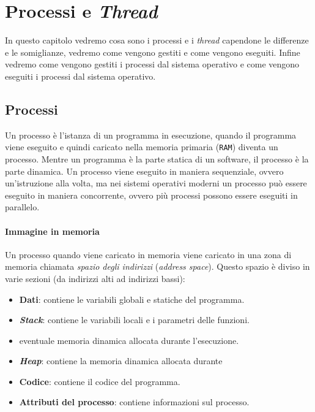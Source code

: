 \chapter{Processi e \textit{Thread}}

In questo capitolo vedremo cosa sono i processi e i \textit{thread} capendone le differenze e le somiglianze, vedremo come vengono gestiti e come vengono eseguiti. Infine vedremo come vengono gestiti i processi dal sistema operativo e come vengono eseguiti i processi dal sistema operativo.

\section{Processi}
    Un processo è l'istanza di un programma in esecuzione, quando il programma viene eseguito e quindi caricato nella memoria primaria (\texttt{RAM}) diventa un processo. Mentre un programma è la parte statica di un software, il processo è la parte dinamica. Un processo viene eseguito in maniera sequenziale, ovvero un'istruzione alla volta, ma nei sistemi operativi moderni un processo può essere eseguito in maniera concorrente, ovvero più processi possono essere eseguiti in parallelo.
    \subsubsection{Immagine in memoria}
        Un processo quando viene caricato in memoria viene caricato in una zona di memoria chiamata \textit{spazio degli indirizzi} (\textit{address space}). Questo spazio è diviso in varie sezioni (da indirizzi alti ad indirizzi bassi):
        \begin{itemize}
            \item \textbf{Dati}: contiene le variabili globali e statiche del programma.
            \item \textbf{\textit{Stack}}: contiene le variabili locali e i parametri delle funzioni.
            \item eventuale memoria dinamica allocata durante l'esecuzione.
            \item \textbf{\textit{Heap}}: contiene la memoria dinamica allocata durante
            \item \textbf{Codice}: contiene il codice del programma.
            \item \textbf{Attributi del processo}: contiene informazioni sul processo.
        \end{itemize}
